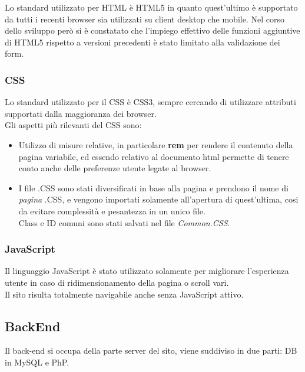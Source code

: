 Lo standard utilizzato per HTML è HTML5 in quanto quest’ultimo è supportato da tutti i recenti browser sia utilizzati su client desktop che mobile. 
Nel corso dello sviluppo però si è constatato che l’impiego effettivo delle funzioni aggiuntive di HTML5 rispetto a versioni precedenti è stato limitato alla validazione dei form.

\subsubsection{CSS}
Lo standard utilizzato per il CSS è CSS3, sempre cercando di utilizzare attributi supportati dalla maggioranza dei browser.\\
Gli aspetti più rilevanti del CSS sono:
\begin{itemize}
	\item Utilizzo di misure relative, in particolare \textbf{rem} per rendere il contenuto della pagina variabile, ed essendo relativo al documento html permette di tenere conto anche delle preferenze utente legate al browser.
	\item I file .CSS sono stati diversificati in base alla pagina e prendono il nome di \textit{pagina} .CSS, e vengono importati solamente all'apertura di quest'ultima, cosi da evitare complessità e pesantezza in un unico file.\\Class e ID comuni sono stati salvati nel file \textit{Common.CSS}.
\end{itemize}

\subsubsection{JavaScript}
Il linguaggio JavaScript è stato utilizzato solamente per migliorare l'esperienza utente in caso di ridimensionamento della pagina o scroll vari.\\ Il sito risulta totalmente navigabile anche senza JavaScript attivo.
\newpage
\subsection{BackEnd}
Il back-end si occupa della parte server del sito, viene suddiviso in due parti: DB in MySQL e PhP.

